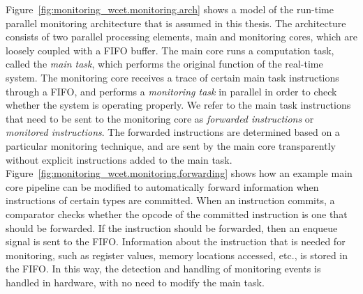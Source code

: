 Figure~\ref{fig:monitoring_wcet.monitoring.arch} shows a model of the
run-time parallel monitoring architecture that is assumed in this thesis. The
architecture consists of two parallel processing elements, main and monitoring
cores, which are loosely coupled with a FIFO buffer.  The main core runs a
computation task, called the {\em main task}, which performs the original
function of the real-time system.  The monitoring core receives a trace of
certain main task instructions through a FIFO, and performs a {\em monitoring
task} in parallel in order to check whether the system is operating properly.
We refer to the main task instructions that need to be sent to the monitoring
core as {\em forwarded instructions} or {\em monitored instructions}. The
forwarded instructions are determined based on a particular monitoring
technique, and are sent by the main core transparently without explicit
instructions added to the main task.
Figure~\ref{fig:monitoring_wcet.monitoring.forwarding} shows how an example
main core pipeline can be modified to automatically forward information when
instructions of certain types are committed. When an instruction commits, a
comparator checks whether the opcode of the committed instruction is one that
should be forwarded. If the instruction should be forwarded, then an enqueue
signal is sent to the FIFO.  Information about the instruction that is needed
for monitoring, such as register values, memory locations accessed, etc., is
stored in the FIFO. In this way, the detection and handling of monitoring
events is handled in hardware, with no need to modify the main task.

